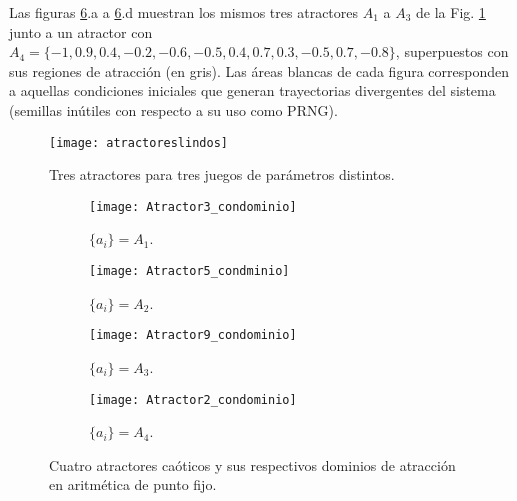 Las figuras \ref{fig:atractores3592}.a a \ref{fig:atractores3592}.d muestran los mismos tres atractores $A_1$ a $A_3$ de la Fig. \ref{fig:atractores} junto a un atractor con $A_4=\{-1,0.9,0.4,-0.2,-0.6,-0.5,0.4,0.7,0.3,-0.5,0.7,-0.8\}$, superpuestos con sus regiones de atracción (en gris).
Las áreas blancas de cada figura corresponden a aquellas condiciones iniciales que generan trayectorias divergentes del sistema (semillas inútiles con respecto a su uso como PRNG).	
\begin{figure}
    \centering
     \texttt{[image: atractoreslindos]}\\
    \caption{Tres atractores para tres juegos de parámetros distintos.}\label{fig:atractores}
\end{figure}
\begin{figure}
    \centering
    \begin{subfigure}[b]{0.49\textwidth}
        \texttt{[image: Atractor3\_condominio]}
        \caption{$\{a_i\}=A_1$.}
        \label{fig:gull}
    \end{subfigure}
    \hfill 
    \begin{subfigure}[b]{0.49\textwidth}
        \texttt{[image: Atractor5\_condminio]}
        \caption{$\{a_i\}=A_2$.}
        \label{fig:tiger}
    \end{subfigure}
   \hfill 
    \begin{subfigure}[b]{0.49\textwidth}
        \texttt{[image: Atractor9\_condominio]}
        \caption{$\{a_i\}=A_3$.}
        \label{fig:mouse}
    \end{subfigure}
  \hfill  
    \begin{subfigure}[b]{0.49\textwidth}
        \texttt{[image: Atractor2\_condominio]}
        \caption{$\{a_i\}=A_4$.}
        \label{fig:mouse}
    \end{subfigure}
    \caption{Cuatro atractores caóticos y sus respectivos dominios de atracción en aritmética de punto fijo.}\label{fig:atractores3592}
\end{figure}